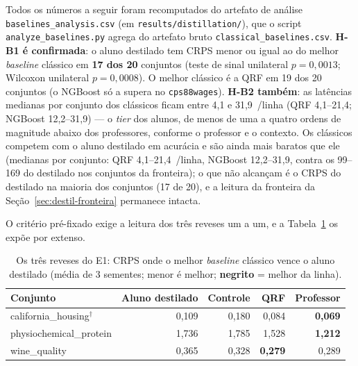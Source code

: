 \begin{sloppypar}
Todos os números a seguir foram recomputados do artefato de análise
\texttt{baselines\_\allowbreak analysis.\allowbreak csv} (em
\texttt{results/\allowbreak distillation/}), que o script
\texttt{analyze\_\allowbreak baselines.\allowbreak py} agrega do artefato bruto
\texttt{classical\_\allowbreak baselines.\allowbreak csv}. \textbf{H-B1 é confirmada}: o
aluno destilado tem CRPS menor ou igual ao do melhor \emph{baseline} clássico
em \textbf{17 dos 20} conjuntos (teste de sinal unilateral
$p = 0{,}0013$; Wilcoxon unilateral $p = 0{,}0008$). O melhor clássico
é a QRF em 19 dos 20 conjuntos (o NGBoost só a supera no
\texttt{cps88wages}). \textbf{H-B2 também}: as latências medianas por
conjunto dos clássicos ficam entre 4,1 e 31,9~\us/linha (QRF
4,1--21,4; NGBoost 12,2--31,9) --- o \emph{tier} dos alunos, de
menos de uma a quatro
ordens de magnitude abaixo dos professores, conforme o professor e o
contexto. Os clássicos competem com o aluno destilado em acurácia e
são ainda mais baratos que ele (medianas por conjunto: QRF
4,1--21,4~\us/linha, NGBoost 12,2--31,9, contra os 99--169 do
destilado nos conjuntos da fronteira); o que não alcançam é o CRPS
do destilado na
maioria dos conjuntos (17 de 20), e a leitura da fronteira
da Seção~\ref{sec:destil-fronteira} permanece intacta.
\end{sloppypar}

O critério pré-fixado exige a leitura dos três reveses um a um, e a
Tabela~\ref{tab:destil-e1-reveses} os expõe por extenso.

\begin{table}[htb]
\centering
\caption[Os três reveses do E1]{Os três reveses do E1: CRPS onde o melhor \emph{baseline}
clássico vence o aluno destilado (média de 3 sementes; menor é melhor;
\textbf{negrito} = melhor da linha).}
\label{tab:destil-e1-reveses}
\small
\begin{tabular}{lrrrr}
\toprule
Conjunto & Aluno destilado & Controle & QRF & Professor \\
\midrule
california\_housing$^\dagger$ & 0,109 & 0,180 & 0,084 & \textbf{0,069} \\
physiochemical\_protein & 1,736 & 1,785 & 1,528 & \textbf{1,212} \\
wine\_quality           & 0,365 & 0,328 & \textbf{0,279} & 0,289 \\
\bottomrule
\end{tabular}
\end{table}

